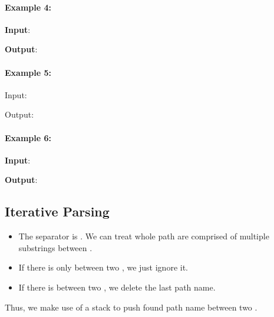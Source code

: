 \paragraph{Example 4:}
\begin{flushleft}


\textbf{Input}: 

\textbf{Output}: 
\end{flushleft}

\paragraph{Example 5:}

\begin{flushleft}
Input: 

Output: 
\end{flushleft}

\paragraph{Example 6:}

\begin{flushleft}
\textbf{Input}: 

\textbf{Output}: 
\end{flushleft}

\subsection{Iterative Parsing}
\begin{itemize}
\item The separator is . We can treat whole path are comprised of multiple substrings between .
\item If there is only  between two , we just ignore it.
\item If there is  between two , we delete the last path name.
\end{itemize}

Thus, we make use of a stack to push found path name between two . 

